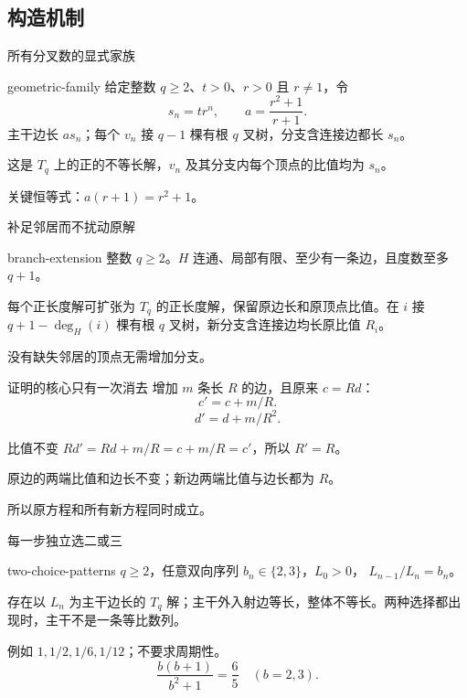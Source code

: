 \documentclass{beamer}
\begin{document}
\subsection{构造机制}
\begin{frame}{所有分叉数的显式家族}
\begin{bookresult}{geometric-family}
给定整数 $q\ge2$、$t>0$、$r>0$ 且 $r\ne1$，令
\[
s_n=tr^n,\qquad a=\frac{r^2+1}{r+1}.
\]
主干边长 $as_n$；每个 $v_n$ 接 $q-1$ 棵有根 $q$ 叉树，分支含连接边都长 $s_n$。

这是 $T_q$ 上的正的不等长解，$v_n$ 及其分支内每个顶点的比值均为 $s_n$。
\end{bookresult}
关键恒等式：$a(r+1)=r^2+1$。
\end{frame}
\begin{frame}{补足邻居而不扰动原解}
\begin{bookresult}{branch-extension}
整数 $q\ge2$。$H$ 连通、局部有限、至少有一条边，且度数至多 $q+1$。

每个正长度解可扩张为 $T_q$ 的正长度解，保留原边长和原顶点比值。在 $i$ 接 $q+1-\deg_H(i)$ 棵有根 $q$ 叉树，新分支含连接边均长原比值 $R_i$。
\end{bookresult}
没有缺失邻居的顶点无需增加分支。
\end{frame}
\begin{frame}{证明的核心只有一次消去}
增加 $m$ 条长 $R$ 的边，且原来 $c=Rd$：
\[
c'=c+m/R.
\]
\[
d'=d+m/R^2.
\]
\begin{block}{比值不变}
$Rd'=Rd+m/R=c+m/R=c'$，所以 $R'=R$。
\end{block}
原边的两端比值和边长不变；新边两端比值与边长都为 $R$。

所以原方程和所有新方程同时成立。
\end{frame}
\begin{frame}{每一步独立选二或三}
\begin{bookresult}{two-choice-patterns}
$q\ge2$，任意双向序列 $b_n\in\{2,3\}$，$L_0>0$，
$L_{n-1}/L_n=b_n$。

存在以 $L_n$ 为主干边长的 $T_q$ 解；主干外入射边等长，整体不等长。两种选择都出现时，主干不是一条等比数列。
\end{bookresult}
例如 $1,1/2,1/6,1/12$；不要求周期性。
\[
\frac{b(b+1)}{b^2+1}=\frac65\quad(b=2,3).
\]
\end{frame}
\end{document}
